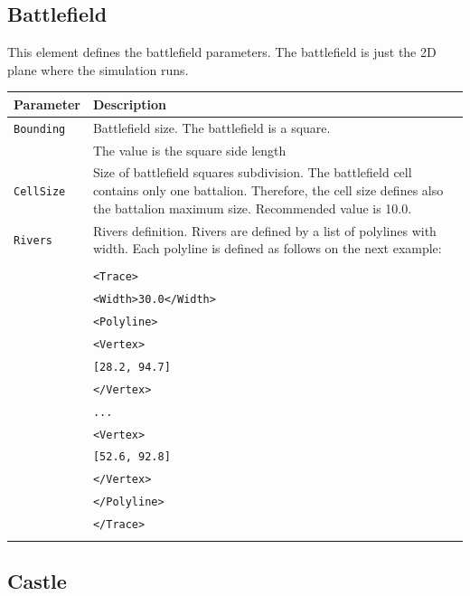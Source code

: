 \documentclass[tog]{acmsiggraph}
\begin{document}
\subsection{Battlefield}
\label{sec:battlefield}

This element defines the battlefield parameters. 
The battlefield is just the 2D plane where the simulation runs.


\begin{tabularx}{0.48\textwidth}{ |l|X| }
\hline 
\textbf{Parameter} & \textbf{Description} \\[0.15cm]
 \hline
 \texttt{Bounding} & Battlefield size. The battlefield is a square.\\
 & The value is the square side length\\
 \hline
 \texttt{CellSize} & Size of battlefield squares subdivision. The battlefield cell contains only one battalion. Therefore, the cell size defines also the battalion maximum size. Recommended value is 10.0.\\
 \hline
 \texttt{Rivers} & Rivers definition. Rivers are defined by a list of polylines with width. Each polyline is defined as follows on the next example: \\
 & \\
 & \quad\texttt{<Trace>} \\
 & \quad\quad\texttt{<Width>30.0</Width>}\\
 & \quad\quad\texttt{<Polyline>}\\
 & \quad\quad\quad\texttt{<Vertex>}\\
 & \quad\quad\quad\quad\texttt{[28.2, 94.7]}\\
 & \quad\quad\quad\texttt{</Vertex>}\\
 & \quad\quad\quad\texttt{...}\\
 & \quad\quad\quad\texttt{<Vertex>}\\
 & \quad\quad\quad\quad\texttt{[52.6, 92.8]}\\
 & \quad\quad\quad\texttt{</Vertex>}\\
 & \quad\quad\texttt{</Polyline>}\\
 & \quad\texttt{</Trace>}\\
 & \\
 \hline
\end{tabularx} 




 
\subsection{Castle}
\label{sec:castle}
\end{document}
